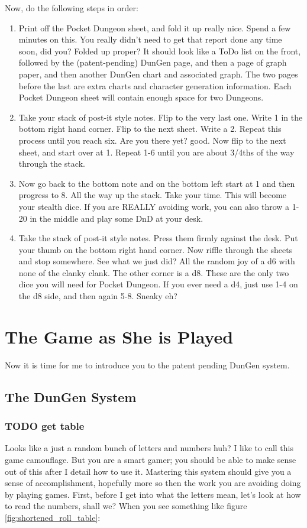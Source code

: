 \documentclass[a6paper,hidelinks]{article}
\begin{document}
Now, do the following steps in order:
\begin{enumerate}
\item Print off the Pocket Dungeon sheet, and fold it up really nice. Spend a few minutes on this. You really didn't need to get that report done any time soon, did you? Folded up proper? It should look like a ToDo list on the front, followed by the (patent-pending) DunGen page, and then a page of graph paper, and then another DunGen chart and associated graph. The two pages before the last are extra charts and character generation information. Each Pocket Dungeon sheet will contain enough space for two Dungeons.
\item Take your stack of post-it style notes. Flip to the very last one. Write 1 in the bottom right hand corner. Flip to the next sheet. Write a 2. Repeat this process until you reach six. Are you there yet? good. Now flip to the next sheet, and start over at 1. Repeat 1-6 until you are about 3/4ths of the way through the stack.
\item Now go back to the bottom note and on the bottom left start at 1 and then progress to 8. All the way up the stack. Take your time. This will become your
stealth dice. If you are REALLY avoiding work, you can also throw a 1-20 in the middle and play some DnD at your desk.
\item Take the stack of post-it style notes. Press them firmly against the desk. Put your thumb on the bottom right hand corner. Now riffle through the sheets and stop somewhere. See what we just did? All the random joy of a d6 with none of the clanky clank. The other corner is a d8. These are the only two dice you will need for Pocket Dungeon. If you ever need a d4, just use 1-4 on the d8 side, and then again 5-8. Sneaky eh?

\end{enumerate}

\section{The Game as She is Played}

Now it is time for me to introduce you to the patent pending DunGen system.

\subsection{The DunGen System}

\subsubsection{TODO get table}
Looks like a just a random bunch of letters and numbers huh? I like to call this game camouflage. But you are a smart gamer; you should be able to make sense out of this after I detail how to use it. Mastering this system
should give you a sense of accomplishment, hopefully more so then the work you are avoiding doing by playing games. First, before I get into what the letters mean, let's look at how to read the numbers, shall we?
When you see something like figure \ref{fig:shortened_roll_table}:
\end{document}
